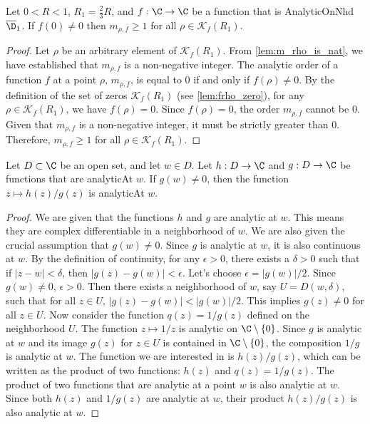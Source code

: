 \begin{lemma}\label{lem:m_rho_ge_1} \leanok
Let $0<R<1$, $R_1=\frac{2}{3}R$, and $f:\C\to\C$ be a function that is AnalyticOnNhd $\overline{\D}_1$. If $f(0)\neq0$ then $m_{\rho,f}\ge1$ for all $\rho\in \mathcal K_f(R_1)$.
\end{lemma}
\begin{proof} \leanok
{}
Let $\rho$ be an arbitrary element of $\mathcal{K}_f(R_1)$.
From \cref{lem:m_rho_is_nat}, we have established that $m_{\rho,f}$ is a non-negative integer.
The analytic order of a function $f$ at a point $\rho$, $m_{\rho,f}$, is equal to 0 if and only if $f(\rho) \neq 0$.
By the definition of the set of zeros $\mathcal{K}_f(R_1)$ (see \cref{lem:frho_zero}), for any $\rho \in \mathcal{K}_f(R_1)$, we have $f(\rho) = 0$.
Since $f(\rho) = 0$, the order $m_{\rho,f}$ cannot be 0.
Given that $m_{\rho,f}$ is a non-negative integer, it must be strictly greater than 0.
Therefore, $m_{\rho,f} \ge 1$ for all $\rho \in \mathcal{K}_f(R_1)$.
\end{proof}


\begin{lemma} \label{lem:analDiv} \leanok
Let $D \subset \C$ be an open set, and let $w\in D$. Let $h:D\to\C$ and $g:D\to\C$ be functions that are analyticAt $w$. If $g(w)\neq0$, then the function $z \mapsto h(z)/g(z)$ is analyticAt $w$.
\end{lemma}
\begin{proof}
\leanok
We are given that the functions $h$ and $g$ are analytic at $w$. This means they are complex differentiable in a neighborhood of $w$.
We are also given the crucial assumption that $g(w) \neq 0$.
Since $g$ is analytic at $w$, it is also continuous at $w$. By the definition of continuity, for any $\epsilon > 0$, there exists a $\delta > 0$ such that if $|z-w| < \delta$, then $|g(z)-g(w)| < \epsilon$. Let's choose $\epsilon = |g(w)|/2$. Since $g(w) \neq 0$, $\epsilon > 0$. Then there exists a neighborhood of $w$, say $U = D(w, \delta)$, such that for all $z \in U$, $|g(z)-g(w)| < |g(w)|/2$. This implies $g(z) \neq 0$ for all $z \in U$.
Now consider the function $q(z) = 1/g(z)$ defined on the neighborhood $U$. The function $z \mapsto 1/z$ is analytic on $\C \setminus \{0\}$. Since $g$ is analytic at $w$ and its image $g(z)$ for $z \in U$ is contained in $\C \setminus \{0\}$, the composition $1/g$ is analytic at $w$.
The function we are interested in is $h(z)/g(z)$, which can be written as the product of two functions: $h(z)$ and $q(z) = 1/g(z)$.
The product of two functions that are analytic at a point $w$ is also analytic at $w$.
Since both $h(z)$ and $1/g(z)$ are analytic at $w$, their product $h(z)/g(z)$ is also analytic at $w$.
\end{proof}


